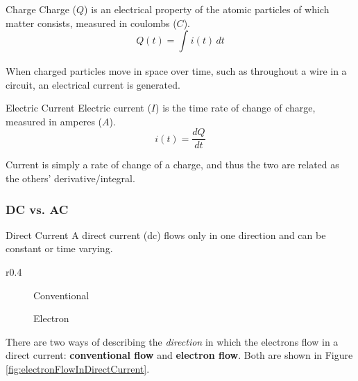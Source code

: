 \documentclass[12pt]{article}
\begin{document}
\begin{definition}{Charge}
  Charge ($Q$) is an electrical property of the atomic particles of which matter consists, measured in coulombs ($C$).
  \begin{equation*}
    Q(t) = \int_{}^{} i(t) \,dt
  \end{equation*}
\end{definition}

When charged particles move in space over time, such as throughout a wire in a circuit, an electrical current is generated.

\begin{definition}{Electric Current}
  Electric current ($I$) is the time rate of change of charge, measured in amperes ($A$).
  \begin{equation*}
    i(t) = \frac{dQ}{dt}
  \end{equation*}
\end{definition}

Current is simply a rate of change of a charge, and thus the two are related as the others' derivative/integral.

\subsubsection{DC vs. AC}
\label{sssec:dcvsac}

\begin{definition}{Direct Current}
  A direct current (dc) flows only in one direction and can be constant or time varying.
\end{definition}

\begin{wrapfigure}[4]{r}{0.4\textwidth}
  \centering
  \begin{subfigure}[H]{0.15\textwidth}
    \centering
    
    \caption{Conventional}
    \label{fig:001}
  \end{subfigure}
  \begin{subfigure}[H]{0.15\textwidth}
    \centering
    
    \caption{Electron}
    \label{fig:002}
  \end{subfigure}
  \caption{Electron Flow in Direct Currents}
  \label{fig:electronFlowInDirectCurrent}
\end{wrapfigure}

There are two ways of describing the \textit{direction} in which the electrons flow in a direct current: \textbf{conventional flow} and \textbf{electron flow}. Both are shown in Figure \ref{fig:electronFlowInDirectCurrent}.
\end{document}
